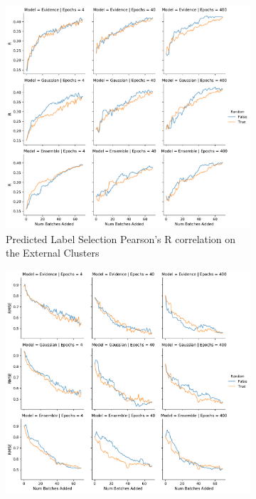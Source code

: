 \documentclass[journal=jmcmar,manuscript=article]{achemso}
\begin{document}
\begin{figure}[tbph]
\begin{subfigure}[b]{0.48\textwidth}
        \includegraphics[width=1\linewidth]{figures/fig10_morgan_bylabel_molbatch_rest_R.pdf} 
        \caption{Predicted Label Selection Pearson's R correlation on the External Clusters}
    \end{subfigure}%
    \hfill
    \begin{subfigure}[b]{0.48\textwidth}
        \includegraphics[width=1\linewidth]{figures/fig10_morgan_bylabel_molbatch_RMSE.pdf} 

\end{subfigure}
\end{figure}
\end{document}
